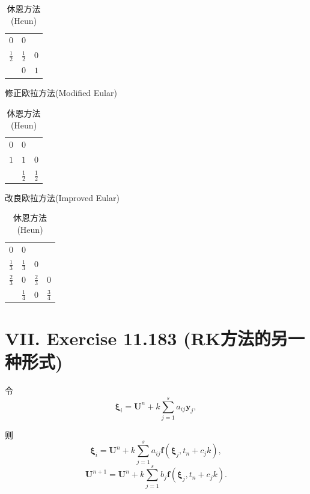 \documentclass[twoside,a4paper]{article}
\begin{document}
\begin{table}[H]
    \renewcommand\arraystretch{1.2}
    \centering
    \begin{minipage}[t]{0.3\linewidth}
        \centering
        \begin{tabular}{l|ll}
            $0$           & $0$           &     \\
            $\frac{1}{2}$ & $\frac{1}{2}$ & $0$ \\ \hline
                        & $0$           & $1$
        \end{tabular}
        \caption*{修正欧拉方法(Modified Eular)}
    \end{minipage}
    \begin{minipage}[t]{0.3\linewidth}
        \centering
        \begin{tabular}{l|ll}
            $0$           & $0$           &     \\
            $1$ & $1$ & $0$ \\ \hline
                        & $\frac{1}{2}$           & $\frac{1}{2}$
        \end{tabular}
        \caption*{改良欧拉方法(Improved Eular)}
    \end{minipage}
    \begin{minipage}[t]{0.3\linewidth}
        \centering
        \begin{tabular}{l|lll}
            $0$           & $0$           &    &  \\
            $\frac{1}{3}$ & $\frac{1}{3}$ & $0$ & \\
            $\frac{2}{3}$ & $0$ & $\frac{2}{3}$ & $0$ \\ \hline
                        & $\frac{1}{4}$     & $0$      & $\frac{3}{4}$
        \end{tabular}
        \caption*{休恩方法(Heun)}
    \end{minipage}
\end{table}

\section*{VII. Exercise 11.183 (RK方法的另一种形式)}

\;\;\;\;\;\;令
\begin{equation*}
    \mathbf{\xi}_i=\mathbf{U}^n+k\sum_{j=1}^s a_{ij}\mathbf{y}_j,
\end{equation*}

则
\begin{equation*}
    \mathbf{\xi}_i=\mathbf{U}^n+k\sum_{j=1}^s a_{ij}\mathbf{f}(\mathbf{\xi}_j,t_n+c_jk),
\end{equation*}
\begin{equation*}
    \mathbf{U}^{n+1}=\mathbf{U}^n+k\sum_{j=1}^s b_j\mathbf{f}(\mathbf{\xi}_j,t_n+c_jk).
\end{equation*}
\end{document}
